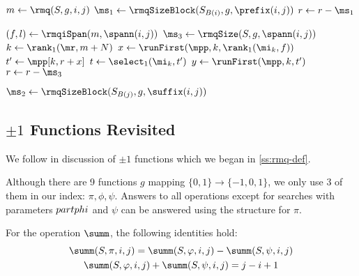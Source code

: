 \begin{algorithm}
\begin{algorithmic}
	\State $m \gets \rmq(S, g, i, j)$
	 
		\State $\ms_1 \gets \rmqSizeBlock(S_{B(i)}, g, \prefix(i, j))$ 
			\State {}
		\Else
			\State $r \gets r - \ms_1$
		\EndIf
	\EndIf
	
	\State $(f, l) \gets \rmqiSpan(m, \spann(i, j))$
	 
		\State $\ms_3 \gets \rmqSize(S, g, \spann(i, j))$
			\State $k \gets \rank_1(\mr, m + N)$ 
			\State $x \gets \runFirst(\mpp, k, \rank_1(\mi_k, f))$ 
			\State $t' \gets \mpp[k, r + x]$
			\State $t \gets \select_1(\mi_k, t')$ 
			\State $y \gets \runFirst(\mpp, k, t')$ 
			\State {}
		\Else
			\State $r \gets r - \ms_3$
		\EndIf
	\EndIf

	 
		\State $\ms_2 \gets \rmqSizeBlock(S_{B(j)}, g, \suffix(i, j))$ 
			\State {}
		\Else
			\State {}
		\EndIf
	\EndIf
\EndFunction
\end{algorithmic}
\end{algorithm}

\subsection{$\pm 1$ Functions Revisited}

We follow in discussion of $\pm 1$ functions which we began in \ref{ss:rmq-def}.

Although there are 9 functions $g$ mapping $\{0, 1\} \to \{-1, 0, 1\}$, we only use 3 of them in our index: $\pi, \phi, \psi$.
Answers to all operations except for searches with parameters $\\part{phi}$ and $\psi$ can be answered using the structure for $\pi$.

For the operation $\summ$, the following identities hold:
\begin{gather*}
	\summ(S, \pi, i, j) = \summ(S, \phi, i, j) - \summ(S, \psi, i, j) \\
	\summ(S, \phi, i, j) + \summ(S, \psi, i, j) = j - i + 1
\end{gather*}


